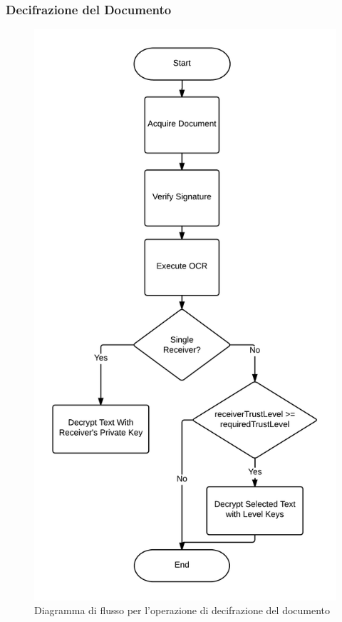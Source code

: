 \subsubsection{Decifrazione del Documento}
	\begin{center}	
		\begin{figure}[H]
		\centering
		\includegraphics[scale=0.6]{Immagini/decifrazione_vert}
		\caption[Flusso decifrazione documento]{Diagramma di flusso per l'operazione di decifrazione del documento}
		\label{fig:decifrazione}
		\end{figure}
	\end{center}